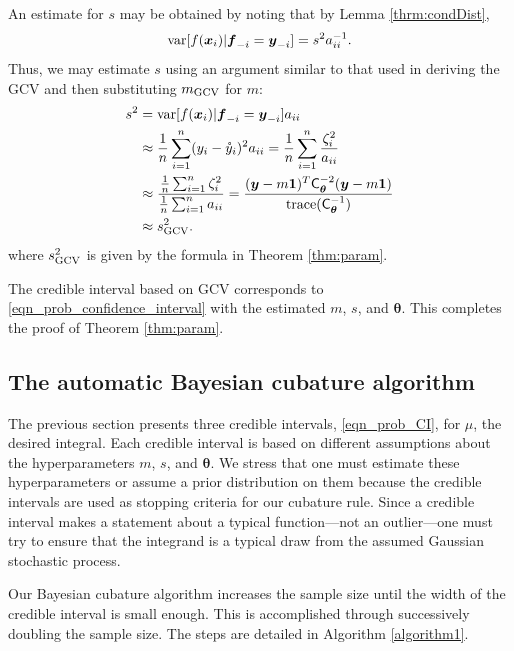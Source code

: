 \documentclass[twocolumn]{svjour3}          %
\newcommand{\bm}[1]{\boldsymbol{#1}}
\newcommand{\trace}[1]{\textup{trace}{#1}}
\newcommand{\vtheta}{{\bm{\theta}}}
\newcommand{\vf}{\bm{f}}
\newcommand{\vx}{\bm{x}}
\newcommand{\vy}{\bm{y}}
\newcommand{\vone}{\bm{1}}
\newcommand{\mC}{\mathsf{C}}
\newcommand{\var}{{\textup{var}}}
\begin{document}
An estimate for $s$ may be obtained by noting that by Lemma \ref{thrm:condDist},
\begin{align*}
\var[f(\vx_i ) | \vf_{-i} = \vy_{-i}] = s^2 a_{ii}^{-1}.
\end{align*}
Thus, we may estimate $s$ using an argument similar to that used in deriving the GCV and then substituting $m_{\textup{GCV}}$ for $m$:
\begin{align*}
s^2 &= \var[f(\vx_i ) | \vf_{-i} = \vy_{-i}] a_{ii} \\ 
& \approx \frac 1n \sum_{i=1}^n (y_i - \mathring{y}_i)^2a_{ii}
 = \frac 1n \sum_{i=1}^n \frac{\zeta_i^2}{a_{ii}} \\ 
 & \approx \frac{ \frac 1n \sum_{i=1}^n \zeta_i^2}{\frac 1n \sum_{i=1}^n a_{ii} } = \frac{(\vy - m\vone)^T \mC_\vtheta^{-2} (\vy - m \vone)}{ \trace(\mC_\vtheta^{-1}) } \\ 
 & \approx  s^2_{\textup{GCV}}.
\end{align*}
where $s^2_{\textup{GCV}}$ is given by the formula in Theorem \ref{thm:param}.

The credible interval based on GCV corresponds to \eqref{eqn_prob_confidence_interval} with the estimated $m$, $s$, and $\vtheta$.  This completes the proof of Theorem \ref{thm:param}.


\subsection{The automatic Bayesian cubature algorithm}
\label{sec:bayes_cubature_algo}
The previous section presents three credible intervals, \eqref{eqn_prob_CI}, for $\mu$, the desired integral.  Each credible interval is based on different assumptions about the hyperparameters $m$, $s$, and $\vtheta$.  We stress that one must estimate these hyperparameters or assume a prior distribution on them because the credible intervals are used as stopping criteria for our cubature rule.  Since a credible interval makes a statement about a typical function---not an outlier---one must try to ensure that the integrand is a typical draw from the assumed Gaussian stochastic process.

Our  Bayesian cubature algorithm increases the sample size until the width of the credible interval is small enough.  This is accomplished through successively doubling the sample size.  The steps are detailed in Algorithm \ref{algorithm1}.
\end{document}
